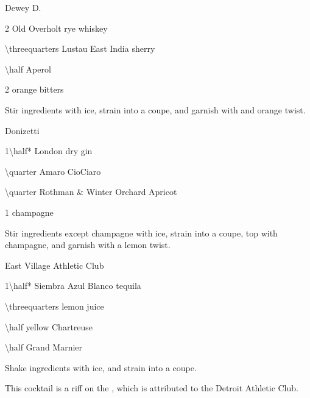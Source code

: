 \begin{Cocktail}[\PDT]{Dewey D.}
  \begin{Ingredients}
  \item \SI{2}{\oz} Old Overholt rye whiskey
  \item \SI{\threequarters}{\oz} Lustau East India sherry
  \item \SI{\half}{\oz} Aperol
  \item 2 \si{\dashes} orange bitters
  \end{Ingredients}
  
  \begin{Instructions}
	Stir ingredients with ice, strain into a coupe, and garnish with and orange twist.
  \end{Instructions}
\end{Cocktail}

\begin{Cocktail}[\PDT]{Donizetti}
  \begin{Ingredients}
  \item \SI{1\half*}{\oz} London dry gin
  \item \SI{\quarter}{\oz} Amaro CioCiaro
  \item \SI{\quarter}{\oz} Rothman \& Winter Orchard Apricot
  \item \SI{1}{\oz} champagne
  \end{Ingredients}
  
  \begin{Instructions}
	Stir ingredients except champagne with ice, strain into a coupe, top with champagne, and garnish with a lemon twist.
  \end{Instructions}
\end{Cocktail}

\begin{Cocktail}[\PDT]{East Village Athletic Club}
  \begin{Ingredients}
  \item \SI{1\half*}{\oz} Siembra Azul Blanco tequila
  \item \SI{\threequarters}{\oz} lemon juice
  \item \SI{\half}{\oz} yellow Chartreuse
  \item \SI{\half}{\oz} Grand Marnier
  \end{Ingredients}
  
  \begin{Instructions}
	Shake ingredients with ice, and strain into a coupe.
	
	This cocktail is a riff on the , which is attributed to the Detroit Athletic Club.
  \end{Instructions}
\end{Cocktail}

